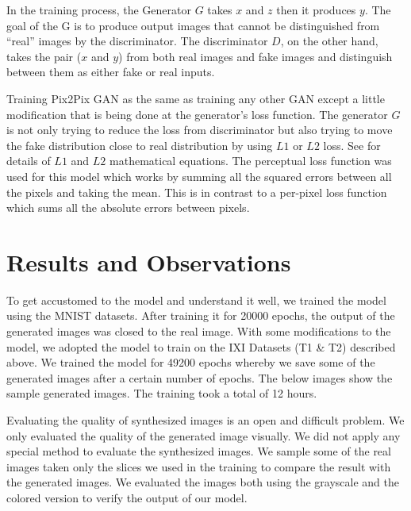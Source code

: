 \documentclass[conference]{IEEEtran}
\begin{document}
In the training process, the  Generator $G$ takes $x$ and $z$ then it produces $y$. The goal of the G is to produce output images that cannot be distinguished from “real” images by the discriminator. The discriminator $D$, on the other hand, takes the pair ($x$ and $y$) from both real images and fake images and distinguish between them as either fake or real inputs.

Training Pix2Pix GAN as the same as training any other GAN except a little modification that is being done at the generator’s loss function. The generator $G$ is not only trying to reduce the loss from discriminator but also trying to move the fake distribution close to real distribution by using $L1$ or $L2$ loss. See \cite{isola2016imagetoimage} for details of $L1$ and $L2$ mathematical equations. The perceptual loss function was used for this model which works by summing all the squared errors between all the pixels and taking the mean. This is in contrast to a per-pixel loss function which sums all the absolute errors between pixels.

\section{Results and Observations} %
To get accustomed to the model and understand it well, we trained the model using the MNIST datasets. After training it for 20000 epochs, the output of the generated images was closed to the real image. With some modifications to the model, we adopted the model to train on the IXI Datasets (T1 \& T2) described above. We trained the model for 49200 epochs whereby we save some of the generated images after a certain number of epochs. The below images show the sample generated images. The training took a total of 12 hours.

Evaluating the quality of synthesized images is an open and difficult problem. We only evaluated the quality of the generated image visually. We did not apply any special method to evaluate the synthesized images. We sample some of the real images taken only the slices we used in the training to compare the result with the generated images. We evaluated the images both using the grayscale and the colored version to verify the output of our model. 
\end{document}
